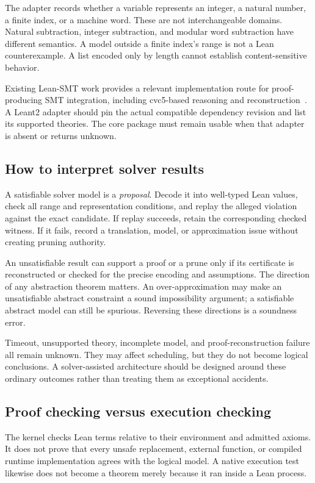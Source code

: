 \documentclass[11pt,letterpaper]{article}
\theoremstyle{definition}
\theoremstyle{remark}
\begin{document}
The adapter records whether a variable represents an integer, a natural number, a finite index, or a machine word. These are not interchangeable domains. Natural subtraction, integer subtraction, and modular word subtraction have different semantics. A model outside a finite index's range is not a Lean counterexample. A list encoded only by length cannot establish content-sensitive behavior.

Existing Lean-SMT work provides a relevant implementation route for proof-producing SMT integration, including cvc5-based reasoning and reconstruction~\cite{leansmt}. A Leant2 adapter should pin the actual compatible dependency revision and list its supported theories. The core package must remain usable when that adapter is absent or returns unknown.

\subsection{How to interpret solver results}

A satisfiable solver model is a \emph{proposal}. Decode it into well-typed Lean values, check all range and representation conditions, and replay the alleged violation against the exact candidate. If replay succeeds, retain the corresponding checked witness. If it fails, record a translation, model, or approximation issue without creating pruning authority.

An unsatisfiable result can support a proof or a prune only if its certificate is reconstructed or checked for the precise encoding and assumptions. The direction of any abstraction theorem matters. An over-approximation may make an unsatisfiable abstract constraint a sound impossibility argument; a satisfiable abstract model can still be spurious. Reversing these directions is a soundness error.

Timeout, unsupported theory, incomplete model, and proof-reconstruction failure all remain unknown. They may affect scheduling, but they do not become logical conclusions. A solver-assisted architecture should be designed around these ordinary outcomes rather than treating them as exceptional accidents.

\subsection{Proof checking versus execution checking}

The kernel checks Lean terms relative to their environment and admitted axioms. It does not prove that every unsafe replacement, external function, or compiled runtime implementation agrees with the logical model. A native execution test likewise does not become a theorem merely because it ran inside a Lean process.
\end{document}
